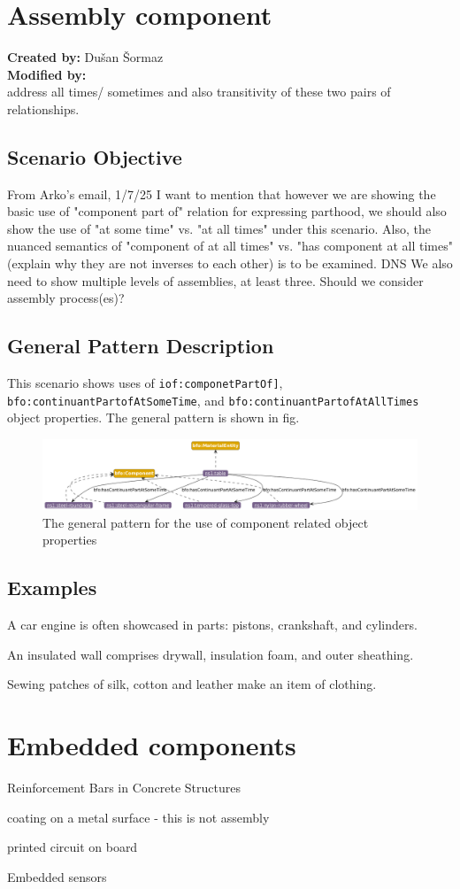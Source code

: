 \section{Assembly component}

\textbf{Created by:} Dušan Šormaz \\
\textbf{Modified by:}  \\

address all times/ sometimes and also transitivity of these two pairs of relationships.

\subsection*{Scenario Objective}
From Arko's email, 1/7/25 
I want to mention that however we are showing the basic use of "component part of" relation for expressing parthood, we should also show the use of "at some time" vs. "at all times" under this scenario. Also, the nuanced semantics of "component of at all times" vs. "has component at all times" (explain why they are not inverses to each other) is to be examined.
DNS
We also need to show multiple levels of assemblies, at least three. Should we consider assembly process(es)?
\subsection*{General Pattern Description}
This scenario shows uses of \texttt{iof:componetPartOf]}, \texttt{bfo:continuantPartofAtSomeTime}, and \texttt{bfo:continuantPartofAtAllTimes} object properties. The general pattern is shown in fig. 

\begin{figure}
\includegraphics[scale=0.5]{scenarios/object-artifact-material/image/what-is-made-of.png}
\caption{The general pattern for the use of component related object properties} 
\label{gen-pttn-components}
\end{figure}


\subsection*{Examples}

A car engine is often showcased in parts: pistons, crankshaft, and cylinders.

An insulated wall comprises drywall, insulation foam, and outer sheathing.

Sewing patches of silk, cotton and leather make an item of clothing.

\section{Embedded components}

Reinforcement Bars in Concrete Structures

coating on a metal surface - this is not assembly

printed circuit on board

Embedded sensors